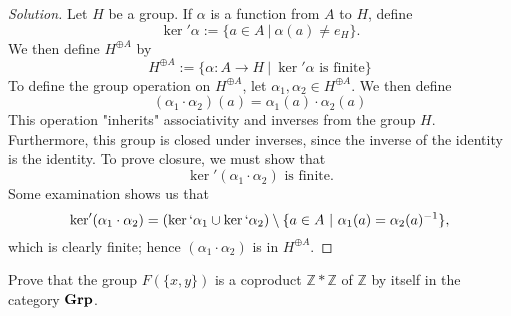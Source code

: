 \documentclass[12pt]{article}
\newenvironment{problem}[2][Problem]{\begin{trivlist}
\item[\hskip \labelsep {\bfseries #1}\hskip \labelsep {\bfseries #2.}]}{\end{trivlist}}
\newcommand{\catname}[1]{\normalfont\textbf{#1}}
\newenvironment{solution}
  {\renewcommand\qedsymbol{$\blacksquare$}\begin{proof}[Solution]}
{\end{proof}}
\begin{document}
\begin{solution}
  Let $H$ be a group. 
  If $\alpha$ is a function from $A$ to $H$, define 
  $$\ker' \alpha := \{a\in A \ |\ \alpha(a) \neq e_H\}.$$
  We then define $H^{\oplus A}$ by
  \begin{equation*}
    H^{\oplus A} := \{\alpha : A \to H\ |\ \ker' \alpha \text{ is finite}\}
  \end{equation*}
  To define the group operation on $H^{\oplus A}$, let $\alpha_1, \alpha_2\in H^{\oplus A}$.
  We then define
  \begin{equation*}
    (\alpha_1\cdot\alpha_2)(a) = \alpha_1(a) \cdot \alpha_2(a)
  \end{equation*}
  This operation "inherits" associativity and inverses from the group $H$.
  Furthermore, this group is closed under inverses, since the inverse of the identity is the identity.
  To prove closure, we must show that
  \begin{equation*}
    \ker' (\alpha_1\cdot\alpha_2) \text{ is finite.}
  \end{equation*}
  Some examination shows us that
  \begin{equation*}
    \ker' (\alpha_1\cdot\alpha_2) = (\ker` \alpha_1 \cup \ker` \alpha_2) \setminus 
    \{a\in A\ |\ \alpha_1(a) = \alpha_2(a)^{-1}\},
  \end{equation*}
  which is clearly finite; hence $(\alpha_1\cdot\alpha_2)$ is in $H^{\oplus A}$.
\end{solution}
\begin{problem}{5.6}
  Prove that the group $F(\{x,y\})$ is a coproduct $\mathbb{Z}*\mathbb{Z}$ of 
  $\mathbb{Z}$ by itself in the category $\catname{Grp}$.
\end{problem}
\end{document}
